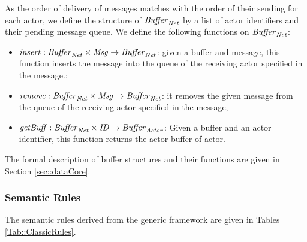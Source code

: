 As the order of delivery of messages matches with the order of their sending for each actor, we define the structure of $\mathit{Buffer}_{\it Net}$ by a list of actor identifiers and their pending message queue. %
We define the following functions on $\mathit{Buffer}_{\it Net}$:\begin{itemize} 
\item $\mathit{insert}:\mathit{Buffer}_{\it Net} \times \mathit{Msg}\rightarrow \mathit{Buffer}_{\it Net}$: given a buffer and message, this function inserts the message into the queue of the receiving actor specified in the message.;
\item $\mathit{remove}:\mathit{Buffer}_{\it Net} \times \mathit{Msg} \rightarrow \mathit{Buffer}_{\it Net} $: it removes the given message from the queue of the receiving actor specified in the message,
\item ${\it getBuff}:\mathit{Buffer}_{\it Net} \times \mathit{ID} \rightarrow \mathit{Buffer}_{\it Actor} $: Given a buffer and an actor identifier, this function returns the actor buffer of actor.
\end{itemize}

The formal description of buffer structures and their functions are given in Section \ref{sec::dataCore}.

\subsubsection{Semantic Rules}
The semantic rules derived from the generic framework are given in Tables \ref{Tab::ClassicRules}. %




